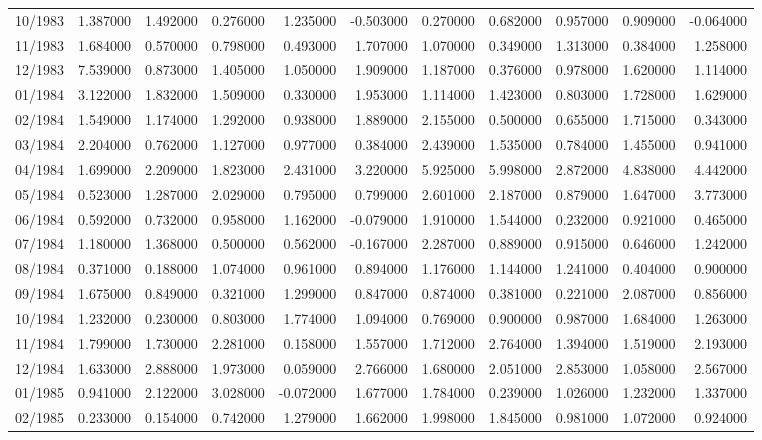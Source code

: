 \begin{tabular}{lrrrrrrrrrr}
10/1983 & 1.387000 & 1.492000 & 0.276000 & 1.235000 & -0.503000 & 0.270000 & 0.682000 & 0.957000 & 0.909000 & -0.064000 \\
11/1983 & 1.684000 & 0.570000 & 0.798000 & 0.493000 & 1.707000 & 1.070000 & 0.349000 & 1.313000 & 0.384000 & 1.258000 \\
12/1983 & 7.539000 & 0.873000 & 1.405000 & 1.050000 & 1.909000 & 1.187000 & 0.376000 & 0.978000 & 1.620000 & 1.114000 \\
01/1984 & 3.122000 & 1.832000 & 1.509000 & 0.330000 & 1.953000 & 1.114000 & 1.423000 & 0.803000 & 1.728000 & 1.629000 \\
02/1984 & 1.549000 & 1.174000 & 1.292000 & 0.938000 & 1.889000 & 2.155000 & 0.500000 & 0.655000 & 1.715000 & 0.343000 \\
03/1984 & 2.204000 & 0.762000 & 1.127000 & 0.977000 & 0.384000 & 2.439000 & 1.535000 & 0.784000 & 1.455000 & 0.941000 \\
04/1984 & 1.699000 & 2.209000 & 1.823000 & 2.431000 & 3.220000 & 5.925000 & 5.998000 & 2.872000 & 4.838000 & 4.442000 \\
05/1984 & 0.523000 & 1.287000 & 2.029000 & 0.795000 & 0.799000 & 2.601000 & 2.187000 & 0.879000 & 1.647000 & 3.773000 \\
06/1984 & 0.592000 & 0.732000 & 0.958000 & 1.162000 & -0.079000 & 1.910000 & 1.544000 & 0.232000 & 0.921000 & 0.465000 \\
07/1984 & 1.180000 & 1.368000 & 0.500000 & 0.562000 & -0.167000 & 2.287000 & 0.889000 & 0.915000 & 0.646000 & 1.242000 \\
08/1984 & 0.371000 & 0.188000 & 1.074000 & 0.961000 & 0.894000 & 1.176000 & 1.144000 & 1.241000 & 0.404000 & 0.900000 \\
09/1984 & 1.675000 & 0.849000 & 0.321000 & 1.299000 & 0.847000 & 0.874000 & 0.381000 & 0.221000 & 2.087000 & 0.856000 \\
10/1984 & 1.232000 & 0.230000 & 0.803000 & 1.774000 & 1.094000 & 0.769000 & 0.900000 & 0.987000 & 1.684000 & 1.263000 \\
11/1984 & 1.799000 & 1.730000 & 2.281000 & 0.158000 & 1.557000 & 1.712000 & 2.764000 & 1.394000 & 1.519000 & 2.193000 \\
12/1984 & 1.633000 & 2.888000 & 1.973000 & 0.059000 & 2.766000 & 1.680000 & 2.051000 & 2.853000 & 1.058000 & 2.567000 \\
01/1985 & 0.941000 & 2.122000 & 3.028000 & -0.072000 & 1.677000 & 1.784000 & 0.239000 & 1.026000 & 1.232000 & 1.337000 \\
02/1985 & 0.233000 & 0.154000 & 0.742000 & 1.279000 & 1.662000 & 1.998000 & 1.845000 & 0.981000 & 1.072000 & 0.924000 \\

\end{tabular}
